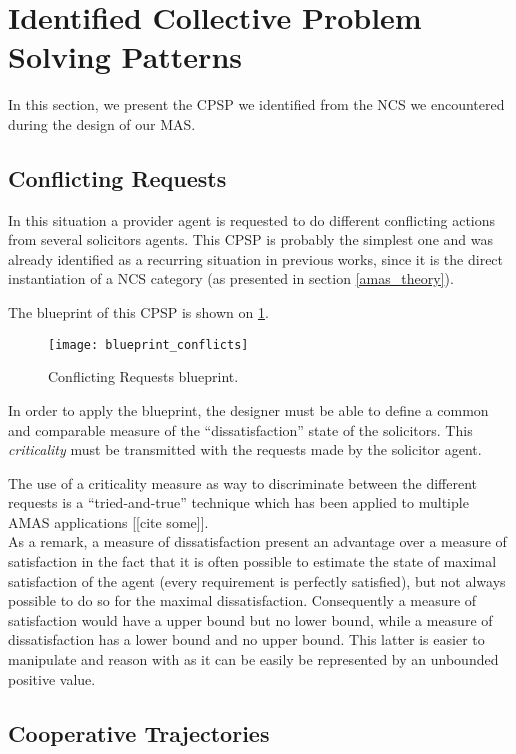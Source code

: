 \section{Identified Collective Problem Solving Patterns}

In this section, we present the CPSP we identified from the NCS we encountered during the design of our MAS.

\subsection{Conflicting Requests}

In this situation a provider agent is requested to do different conflicting actions from several solicitors agents. This CPSP is probably the simplest one and was already identified as a recurring situation in previous works, since it is the direct instantiation of a NCS category (as presented in section \ref{amas_theory}).

The blueprint of this CPSP is shown on \figurename{} \ref{blueprint_conflicts}.

\begin{figure}
\centering
\texttt{[image: blueprint\_conflicts]}
\caption{Conflicting Requests blueprint.}\label{blueprint_conflicts}
\end{figure}

In order to apply the blueprint, the designer must be able to define a common and comparable measure of the \enquote{dissatisfaction} state of the solicitors. This \emph{criticality} must be transmitted with the requests made by the solicitor agent.


The use of a criticality measure as way to discriminate between the different requests is a \enquote{tried-and-true} technique which has been applied to multiple AMAS applications [[cite some]].\\
As a remark, a measure of dissatisfaction present an advantage over a measure of satisfaction in the fact that it is often possible to estimate the state of maximal satisfaction of the agent (every requirement is perfectly satisfied), but not always possible to do so for the maximal dissatisfaction. Consequently a measure of satisfaction would have a upper bound but no lower bound, while a measure of dissatisfaction has a lower bound and no upper bound. This latter is easier to manipulate and reason with as it can be easily be represented by an unbounded positive value.

\subsection{Cooperative Trajectories}

